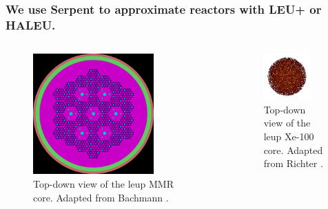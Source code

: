 \documentclass[9pt]{beamer}
\begin{document}
  \begin{frame}
    \frametitle{We use Serpent to approximate reactors with LEU+ or HALEU.}
    \begin{columns}
      \column[t]{5cm}
      \begin{figure}
        \centering
        \includegraphics[width=0.75\textwidth]{images/haleu_mmr_2blocks.inp_geom1.png}
        \caption{Top-down view of the \gls{leup} MMR core. Adapted from Bachmann \cite{bachmann_mmr_like_2023}.}
        \label{fig:td_mmr}
      \end{figure}

      \column[t]{5cm}
      \begin{figure}[htbp!]
        \begin{center}
          \includegraphics[width=0.75\textwidth]{images/htgr-mr-burn-200.inp_mesh1_bstep6.png}
        \end{center}
        \caption{Top-down view of the \gls{leup} Xe-100 core. Adapted from Richter \cite{richter_xe100_like}.}
        \label{fig:td_xe100}
      \end{figure}
    \end{columns}
  \end{frame}
\end{document}
